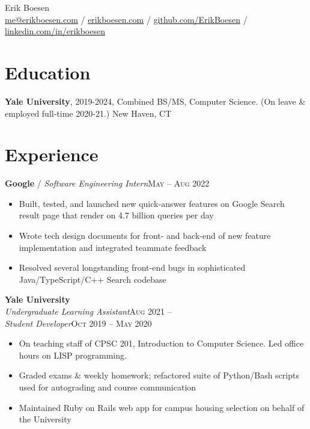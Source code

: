\documentclass[10pt, a4paper]{article}
\begin{document}
{\LARGE Erik Boesen}\\
\href{mailto:me@erikboesen.com}{me@erikboesen.com} / \href{https://erikboesen.com}{erikboesen.com} / \href{https://github.com/ErikBoesen}{github.com/ErikBoesen} / \href{https://www.linkedin.com/in/erikboesen}{linkedin.com/in/erikboesen}\\

\vspace{-7mm}
\section*{Education}
\noindent
\textbf{Yale University}, 2019-2024, Combined BS/MS, Computer Science. (On leave \& employed full-time 2020-21.) New Haven, CT\\

\vspace{-7mm}
\section*{Experience}
\textbf{Google} / \textit{Software Engineering Intern}\hfill \textsc{May -- Aug 2022}\\
\begin{itemize}
    \vspace{-7mm}
    \item Built, tested, and launched new quick-answer features on Google Search result page that render on 4.7 billion queries per day
    \item Wrote tech design documents for front- and back-end of new feature implementation and integrated teammate feedback
    \item Resolved several longstanding front-end bugs in sophisticated Java/TypeScript/C++ Search codebase
\end{itemize}

\textbf{Yale University}\\
\textit{Undergraduate Learning Assistant}\hfill \textsc{Aug 2021 --}\\
\textit{Student Developer}\hfill \textsc{Oct 2019 -- May 2020}\\
\begin{itemize}
    \vspace{-7mm}
    \item On teaching staff of CPSC 201, Introduction to Computer Science. Led office hours on LISP programming.
    \item Graded exams \& weekly homework; refactored suite of Python/Bash scripts used for autograding and course communication
    \item Maintained Ruby on Rails web app for campus housing selection on behalf of the University
\end{itemize}
\end{document}
